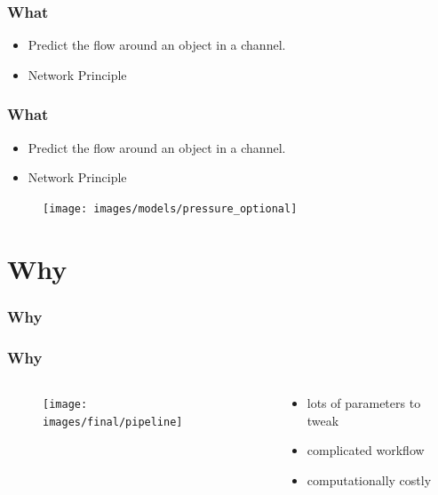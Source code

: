 \documentclass[18pt]{beamer}
\begin{document}
\begin{frame}[t]
  \frametitle{What}
  \begin{itemize}
  \item Predict the flow around an object in a channel.
  \item Network Principle
  \end{itemize}
  
\end{frame}


\begin{frame}[t]
  \frametitle{What}

  \begin{itemize}
  \item Predict the flow around an object in a channel.
  \item Network Principle
  \end{itemize}
  
  \begin{figure}[htb]
    \texttt{[image: images/models/pressure\_optional]}
  \end{figure}
  
\end{frame}

\section{Why}

\begin{frame}[t]
  \frametitle{Why}

\end{frame}

\begin{frame}
  \frametitle{Why}

  \begin{columns}[t]
    \begin{column}{0.5\textwidth}

      \vspace{-0.5cm}
      \begin{center}
        \begin{figure}[htb]
          \texttt{[image: images/final/pipeline]}
        \end{figure}
      \end{center}
      
      
    \end{column}
    \begin{column}{0.5\textwidth}
      \begin{itemize}
      \item lots of parameters to tweak
      \item complicated workflow
      \item computationally costly
      \end{itemize}
    \end{column}
  \end{columns}  
\end{frame}
\end{document}
